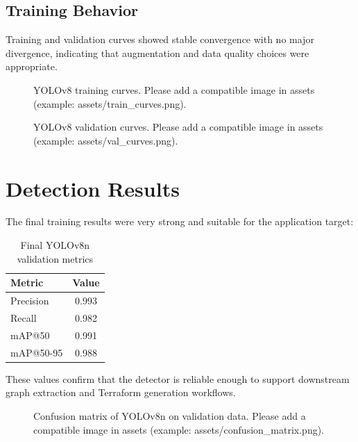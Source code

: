 \documentclass[12pt,a4paper,openany]{report}
\begin{document}
\subsection{Training Behavior}

Training and validation curves showed stable convergence with no major divergence, indicating that augmentation and data quality choices were appropriate.

\begin{figure}[H]
    \centering
    \caption{YOLOv8 training curves. Please add a compatible image in assets (example: assets/train_curves.png).}
    \label{fig:yolo_train_curves}
\end{figure}

\begin{figure}[H]
    \centering
    \caption{YOLOv8 validation curves. Please add a compatible image in assets (example: assets/val_curves.png).}
    \label{fig:yolo_val_curves}
\end{figure}

\section{Detection Results}

The final training results were very strong and suitable for the application target:

\begin{table}[H]
\centering
\caption{Final YOLOv8n validation metrics}
\label{tab:yolo_final_metrics}
\begin{tabular}{lc}
\toprule
\textbf{Metric} & \textbf{Value} \\
\midrule
Precision & 0.993 \\
Recall & 0.982 \\
mAP@50 & 0.991 \\
mAP@50-95 & 0.988 \\
\bottomrule
\end{tabular}
\end{table}

These values confirm that the detector is reliable enough to support downstream graph extraction and Terraform generation workflows.

\begin{figure}[H]
    \centering
    \caption{Confusion matrix of YOLOv8n on validation data. Please add a compatible image in assets (example: assets/confusion_matrix.png).}
    \label{fig:yolo_confusion_matrix}
\end{figure}
\end{document}
